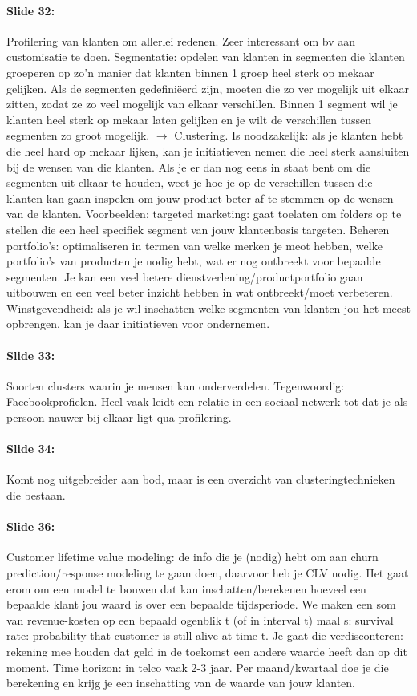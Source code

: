 \documentclass[10pt,a4paper]{report}
\begin{document}
\paragraph{Slide 32:}Profilering van klanten om allerlei redenen. Zeer interessant om bv aan customisatie te doen. Segmentatie: opdelen van klanten in segmenten die klanten groeperen op zo'n manier dat klanten binnen 1 groep heel sterk op mekaar gelijken. Als de segmenten gedefiniëerd zijn, moeten die zo ver mogelijk uit elkaar zitten, zodat ze zo veel mogelijk van elkaar verschillen. Binnen 1 segment wil je klanten heel sterk op mekaar laten gelijken en je wilt de verschillen tussen segmenten zo groot mogelijk. $\rightarrow$ Clustering. Is noodzakelijk: als je klanten hebt die heel hard op mekaar lijken, kan je initiatieven nemen die heel sterk aansluiten bij de wensen van die klanten. Als je er dan nog eens in staat bent om die segmenten uit elkaar te houden, weet je hoe je op de verschillen tussen die klanten kan gaan inspelen om jouw product beter af te stemmen op de wensen van de klanten.
Voorbeelden: targeted marketing: gaat toelaten om folders op te stellen die een heel specifiek segment van jouw klantenbasis targeten. Beheren portfolio's: optimaliseren in termen van welke merken je meot hebben, welke portfolio's van producten je nodig hebt, wat er nog ontbreekt voor bepaalde segmenten. Je kan een veel betere dienstverlening/productportfolio gaan uitbouwen en een veel beter inzicht hebben in wat ontbreekt/moet verbeteren.\\
Winstgevendheid: als je wil inschatten welke segmenten van klanten jou het meest opbrengen, kan je daar initiatieven voor ondernemen.

\paragraph{Slide 33:}Soorten clusters waarin je mensen kan onderverdelen. Tegenwoordig: Facebookprofielen. Heel vaak leidt een relatie in een sociaal netwerk tot dat je als persoon nauwer bij elkaar ligt qua profilering.

\paragraph{Slide 34:}Komt nog uitgebreider aan bod, maar is een overzicht van clusteringtechnieken die bestaan.

\paragraph{Slide 36:}Customer lifetime value modeling: de info die je (nodig) hebt om aan churn prediction/response modeling te gaan doen, daarvoor heb je CLV nodig. Het gaat erom om een model te bouwen dat kan inschatten/berekenen hoeveel een bepaalde klant jou waard is over een bepaalde tijdsperiode.
We maken een som van revenue-kosten op een bepaald ogenblik t (of in interval t) maal s: survival rate: probability that customer is still alive at time t. Je gaat die verdisconteren: rekening mee houden dat geld in de toekomst een andere waarde heeft dan op dit moment. Time horizon: in telco vaak 2-3 jaar. Per maand/kwartaal doe je die berekening en krijg je een inschatting van de waarde van jouw klanten.
\end{document}

